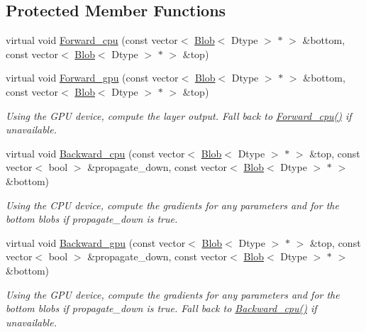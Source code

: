 \subsection*{Protected Member Functions}
\begin{DoxyCompactItemize}
\item 
virtual void \hyperlink{classcaffe_1_1ScaleLayer_a66c4ad1fa89ff7f22301d92bc3c76987}{Forward\+\_\+cpu} (const vector$<$ \hyperlink{classcaffe_1_1Blob}{Blob}$<$ Dtype $>$ $\ast$ $>$ \&bottom, const vector$<$ \hyperlink{classcaffe_1_1Blob}{Blob}$<$ Dtype $>$ $\ast$ $>$ \&top)
\item 
virtual void \hyperlink{classcaffe_1_1ScaleLayer_a758a2a2967a93756e6d91f4e5d3a0438}{Forward\+\_\+gpu} (const vector$<$ \hyperlink{classcaffe_1_1Blob}{Blob}$<$ Dtype $>$ $\ast$ $>$ \&bottom, const vector$<$ \hyperlink{classcaffe_1_1Blob}{Blob}$<$ Dtype $>$ $\ast$ $>$ \&top)\hypertarget{classcaffe_1_1ScaleLayer_a758a2a2967a93756e6d91f4e5d3a0438}{}\label{classcaffe_1_1ScaleLayer_a758a2a2967a93756e6d91f4e5d3a0438}

\begin{DoxyCompactList}\small\item\em Using the G\+PU device, compute the layer output. Fall back to \hyperlink{classcaffe_1_1ScaleLayer_a66c4ad1fa89ff7f22301d92bc3c76987}{Forward\+\_\+cpu()} if unavailable. \end{DoxyCompactList}\item 
virtual void \hyperlink{classcaffe_1_1ScaleLayer_a1b85bd4b699cd20c419430d6fd2a3b9a}{Backward\+\_\+cpu} (const vector$<$ \hyperlink{classcaffe_1_1Blob}{Blob}$<$ Dtype $>$ $\ast$ $>$ \&top, const vector$<$ bool $>$ \&propagate\+\_\+down, const vector$<$ \hyperlink{classcaffe_1_1Blob}{Blob}$<$ Dtype $>$ $\ast$ $>$ \&bottom)\hypertarget{classcaffe_1_1ScaleLayer_a1b85bd4b699cd20c419430d6fd2a3b9a}{}\label{classcaffe_1_1ScaleLayer_a1b85bd4b699cd20c419430d6fd2a3b9a}

\begin{DoxyCompactList}\small\item\em Using the C\+PU device, compute the gradients for any parameters and for the bottom blobs if propagate\+\_\+down is true. \end{DoxyCompactList}\item 
virtual void \hyperlink{classcaffe_1_1ScaleLayer_a4cc31eac96bdef680975ba49f78fcf6a}{Backward\+\_\+gpu} (const vector$<$ \hyperlink{classcaffe_1_1Blob}{Blob}$<$ Dtype $>$ $\ast$ $>$ \&top, const vector$<$ bool $>$ \&propagate\+\_\+down, const vector$<$ \hyperlink{classcaffe_1_1Blob}{Blob}$<$ Dtype $>$ $\ast$ $>$ \&bottom)\hypertarget{classcaffe_1_1ScaleLayer_a4cc31eac96bdef680975ba49f78fcf6a}{}\label{classcaffe_1_1ScaleLayer_a4cc31eac96bdef680975ba49f78fcf6a}

\begin{DoxyCompactList}\small\item\em Using the G\+PU device, compute the gradients for any parameters and for the bottom blobs if propagate\+\_\+down is true. Fall back to \hyperlink{classcaffe_1_1ScaleLayer_a1b85bd4b699cd20c419430d6fd2a3b9a}{Backward\+\_\+cpu()} if unavailable. \end{DoxyCompactList}\end{DoxyCompactItemize}
